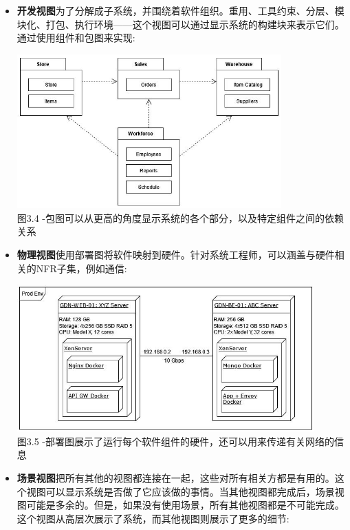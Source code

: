 \begin{itemize}
\item 
\textbf{开发视图}为了分解成子系统，并围绕着软件组织。重用、工具约束、分层、模块化、打包、执行环境——这个视图可以通过显示系统的构建块来表示它们。通过使用组件和包图来实现:

\begin{center}
\includegraphics[width=0.8\textwidth]{content/1/chapter3/images/4.jpg}\\
图3.4 -包图可以从更高的角度显示系统的各个部分，以及特定组件之间的依赖关系
\end{center}

\item
\textbf{物理视图}使用部署图将软件映射到硬件。针对系统工程师，可以涵盖与硬件相关的NFR子集，例如通信:

\begin{center}
\includegraphics[width=0.9\textwidth]{content/1/chapter3/images/5.jpg}\\
图3.5 -部署图展示了运行每个软件组件的硬件，还可以用来传递有关网络的信息
\end{center}

\item
\textbf{场景视图}把所有其他的视图都连接在一起，这些对所有相关方都是有用的。这个视图可以显示系统是否做了它应该做的事情。当其他视图都完成后，场景视图可能是多余的。但是，如果没有使用场景，所有其他视图都是不可能完成。这个视图从高层次展示了系统，而其他视图则展示了更多的细节:


\end{itemize}
